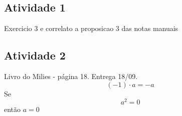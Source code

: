 \documentclass[a4paper,12pt]{article}
\begin{document}
\subsection{Atividade 1}

Exercicio 3 e correlato a proposicao 3 das notas manuais

\subsection{Atividade 2}

Livro do Milies - página 18. Entrega 18/09.
\begin{equation} %
  (-1) \cdot a = -a
\end{equation}
Se 
\begin{equation} %
  a^2 = 0
\end{equation}
então $a = 0$

\nocite{*}


\end{document}
